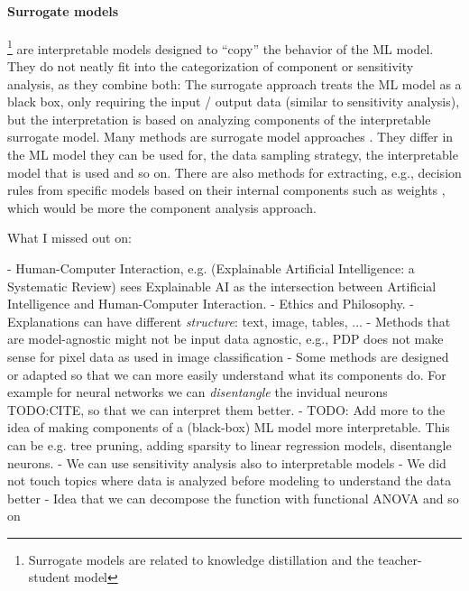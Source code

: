 \documentclass[runningheads]{llncs}
\begin{document}
\paragraph{Surrogate models}\footnote{Surrogate models are related to knowledge distillation and the teacher-student model} are interpretable models designed to \enquote{copy} the behavior of the ML model.
They do not neatly fit into the categorization of component or sensitivity analysis, as they combine both:
The surrogate approach treats the ML model as a black box, only requiring the input / output data  (similar to sensitivity analysis), but the interpretation is based on analyzing components of the interpretable surrogate model.
Many methods are surrogate model approaches \cite{puri2017magix,molnar2019,ming2018rulematrix,ribeiro2016should,frosst2017distilling,bastani2017interpreting,craven1996extracting,krishnan2017palm}.
They differ in the ML model they can be used for, the data sampling strategy, the interpretable model that is used and so on.
There are also methods for extracting, e.g., decision rules from specific models based on their internal components such as weights \cite{andrews1995survey,augasta2012rule}, which would be more the component analysis approach.

What I missed out on:

- Human-Computer Interaction, e.g. (Explainable Artificial Intelligence: a Systematic Review) sees Explainable AI as the intersection between Artificial Intelligence and Human-Computer Interaction.
- Ethics and Philosophy.
- Explanations can have different \textit{structure}: text, image, tables, ...
- Methods that are model-agnostic might not be input data agnostic, e.g., PDP does not make sense for pixel data as used in image classification
- Some methods are designed or adapted so that we can more easily understand what its components do. For example for neural networks we can \textit{disentangle} the invidual neurons TODO:CITE, so that we can interpret them better.
- TODO: Add more to the idea of making components of a (black-box) ML model more interpretable. This can be e.g. tree pruning, adding sparsity to linear regression models, disentangle neurons.
- We can use sensitivity analysis also to interpretable models
- We did not touch topics where data is analyzed before modeling to understand the data better
- Idea that we can decompose the function with functional ANOVA and so on

\end{document}
